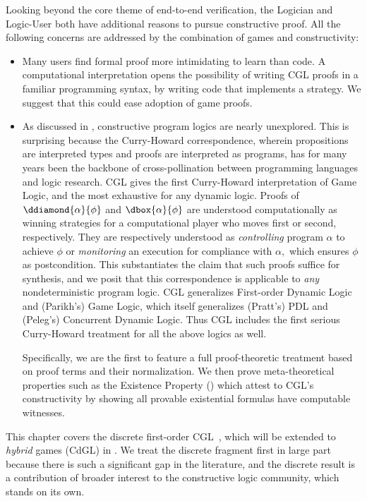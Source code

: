 \documentclass[12pt]{cmuthesis}
\theoremstyle{definition}
\theoremstyle{remark}
\newcommand{\rref}[2][]{\prettyref{#2}}
\newcommand{\CGL}{\textsf{CGL}\xspace}
\newcommand{\CdGL}{\textsf{CdGL}\xspace}
\begin{document}
Looking beyond the core theme of end-to-end verification, the Logician and Logic-User both have additional reasons to pursue constructive proof.
All the following concerns are addressed by the combination of games and constructivity:
\begin{itemize}
\item
Many users find formal proof more intimidating to learn than code.
A computational interpretation opens the possibility of writing \CGL proofs in a familiar programming syntax, by writing code that implements a strategy.
We suggest that this could ease adoption of game proofs.
\item
As discussed in \rref{sec:cgl-relwork}, constructive program logics are nearly unexplored.
This is surprising because the Curry-Howard correspondence, wherein propositions are interpreted types and proofs are interpreted as programs, has for many years been the backbone of cross-pollination between programming languages and logic research.
\CGL gives the first Curry-Howard interpretation of Game Logic, and the most exhaustive for any dynamic logic.
Proofs of $\ddiamond{\alpha}{\phi}$ and $\dbox{\alpha}{\phi}$ are understood computationally as winning strategies for a computational player who moves first or second, respectively.
They are respectively understood as \emph{controlling} program $\alpha$ to achieve $\phi$ or \emph{monitoring} an execution for compliance with $\alpha,$ which ensures $\phi$ as postcondition.
This substantiates the claim that such proofs suffice for synthesis, and we posit that this correspondence is applicable to \emph{any} nondeterministic program logic.
\CGL generalizes  First-order Dynamic Logic and (Parikh's) Game Logic, which itself generalizes (Pratt's) PDL and (Peleg's) Concurrent Dynamic Logic.
Thus \CGL includes the first serious Curry-Howard treatment for all the above logics as well.

Specifically, we are the first to feature a full proof-theoretic treatment based on proof terms and their normalization.
We then prove meta-theoretical properties such as the Existence Property (\rref{lem:term-ep}) which attest to \CGL's constructivity by showing all provable existential formulas have computable witnesses.
\end{itemize}

This chapter covers the discrete first-order \CGL~\cite{poplcgl}, which will be extended to \emph{hybrid} games (\CdGL) in \rref{ch:cdgl}.
We treat the discrete fragment first in large part because there is such a significant gap in the literature, and the discrete result is a contribution of broader interest to the constructive logic community, which stands on its own.
\end{document}

